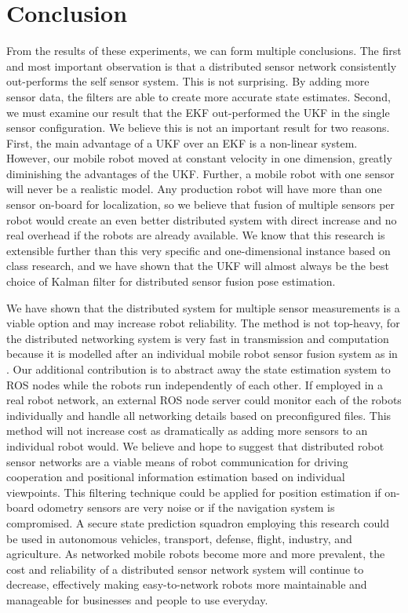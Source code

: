 \documentclass[conference]{IEEEtran} \usepackage[T1]{fontenc} \usepackage[backend=biber, style=ieee]{biblatex}
\begin{document}
\section{Conclusion} \label{Conclusion} 
From the results of these experiments, we can form multiple conclusions. The first and most important observation is that a distributed sensor network consistently 
out-performs the self sensor system. This is not surprising. By adding more sensor data, the filters are able to create more accurate state estimates. Second, we 
must examine our result that the EKF out-performed the UKF in the single sensor configuration. We believe this is not an important result for two reasons. First, the 
main advantage of a UKF over an EKF is a non-linear system. However, our mobile robot moved at constant velocity in one dimension, greatly diminishing the 
advantages of the UKF. Further, a mobile robot with one sensor will never be a realistic model. Any production robot will have more than one sensor on-board for 
localization, so we believe that fusion of multiple sensors per robot would create an even better distributed system with direct increase and no real overhead if 
the robots are already available. We know that this research is extensible further than this very specific and one-dimensional instance based on class research, and 
we have shown that the UKF will almost always be the best choice of Kalman filter for distributed sensor fusion pose estimation.

We have shown that the distributed system for multiple sensor measurements is a viable option and may increase robot reliability. The method is not top-heavy, 
for the distributed networking system is very fast in transmission and computation because it is modelled after an individual mobile robot sensor fusion system as 
in \cite{bezzo2014attack}. Our additional contribution is to abstract away the state estimation system to ROS nodes while the robots run independently of each other. If employed in 
a real robot network, an external ROS node server could monitor each of the robots individually and handle all networking details based on preconfigured files. 
This method will not increase cost as dramatically as adding more sensors to an individual robot would. We believe and hope to suggest that distributed robot sensor 
networks are a viable means of robot communication for driving cooperation and positional information estimation based on individual viewpoints. This filtering 
technique could be applied for position estimation if on-board odometry sensors are very noise or if the navigation system is 
compromised. A secure state prediction squadron employing this research could be used in autonomous vehicles, transport, defense, flight, 
industry, and agriculture. As networked mobile robots become more and more prevalent, the cost and 
reliability of a distributed sensor network system will continue to decrease, effectively making easy-to-network robots more maintainable and manageable for 
businesses and people to use everyday.
\end{document}
